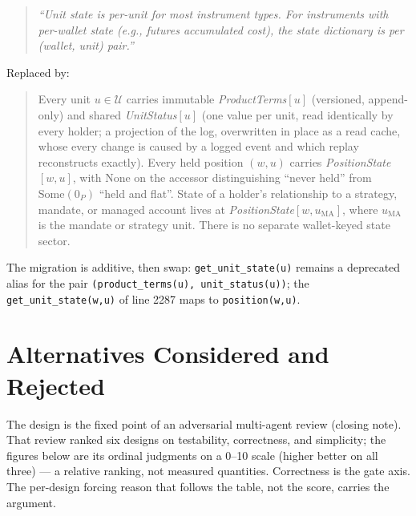 \documentclass[11pt,a4paper]{article}
\begin{document}
\begin{quote}
\textit{``Unit state is per-unit for most instrument types. For instruments with per-wallet
state (e.g., futures accumulated cost), the state dictionary is per (wallet, unit) pair.''}
\end{quote}

\noindent Replaced by:

\begin{quote}
Every unit $u\in\mathcal{U}$ carries immutable \emph{ProductTerms}$[u]$ (versioned,
append-only) and shared \emph{UnitStatus}$[u]$ (one value per unit, read identically by every
holder; a projection of the log, overwritten in place as a read cache, whose every change is
caused by a logged event and which replay reconstructs exactly). Every held
position $(w,u)$ carries \emph{PositionState}$[w,u]$, with $\mathrm{None}$ on the accessor
distinguishing ``never held'' from $\mathrm{Some}(0_P)$ ``held and flat''. State of a
holder's relationship to a strategy, mandate, or managed account lives at
\emph{PositionState}$[w,u_{\mathrm{MA}}]$, where $u_{\mathrm{MA}}$ is the mandate or strategy
unit. There is no separate wallet-keyed state sector.
\end{quote}

\noindent The migration is additive, then swap: \texttt{get\_unit\_state(u)} remains a
deprecated alias for the pair \texttt{(product\_terms(u), unit\_status(u))}; the
\texttt{get\_unit\_state(w,u)} of line 2287 maps to \texttt{position(w,u)}.

\section{Alternatives Considered and Rejected}
\label{sec:pareto}

The design is the fixed point of an adversarial multi-agent review (closing note). That
review ranked six designs on testability, correctness, and simplicity; the figures below are
its ordinal judgments on a 0--10 scale (higher better on all three) --- a relative ranking,
not measured quantities. Correctness is the gate axis. The per-design forcing reason that
follows the table, not the score, carries the argument.
\end{document}
